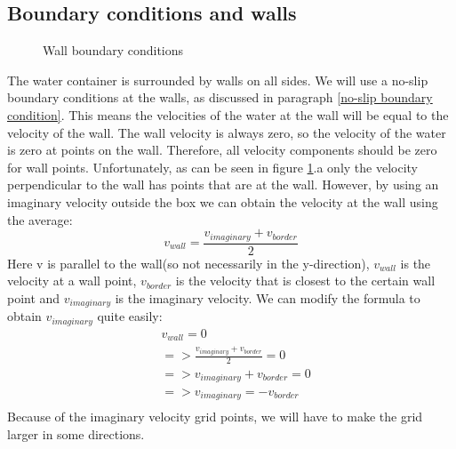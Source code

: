 \documentclass{article}
\begin{document}
\subsection{Boundary conditions and walls} \label{Boundary conditions and walls}
\begin{figure}[ht]
\centering
{}

\caption{Wall boundary conditions} \label{wall boundary conditions}
\end{figure}

The water container is surrounded by walls on all sides.  We will use a no-slip boundary conditions at the walls, as discussed in paragraph \ref{no-slip boundary condition}\cite{MAC}. This means the velocities of the water at the wall will be equal to the velocity of the wall. The wall velocity is always zero, so the velocity of the water is zero at points on the wall. Therefore, all velocity components should be zero for wall points\cite{MAC}. Unfortunately, as can be seen in figure \ref{wall boundary conditions}.a only the velocity perpendicular to the wall has points that are at the wall. However, by using an imaginary velocity outside the box we can obtain the velocity at the wall using the average\cite{MAC}:
\[v_{wall}=\frac{v_{imaginary}+v_{border}}{2}\]
Here v is parallel to the wall(so not necessarily in the y-direction), \(v_{wall}\) is the velocity at a wall point, \(v_{border}\) is the velocity that is closest to the certain wall point and \(v_{imaginary}\) is the imaginary velocity. We can modify the formula to obtain \(v_{imaginary}\) quite easily:
\[\begin{split}
&v_{wall}=0\\
&=>\frac{v_{imaginary}+v_{border}}{2}=0\\
&=>v_{imaginary}+v_{border}=0\\
&=>v_{imaginary}=-v_{border}\\
\end{split}\]
Because of the imaginary velocity grid points, we will have to make the grid larger in some directions.\\ \\
\end{document}
